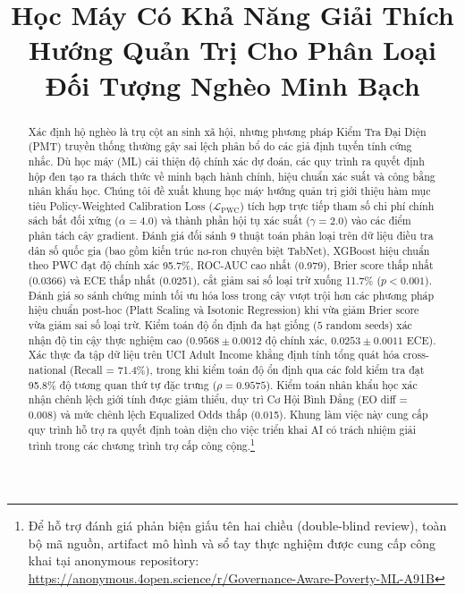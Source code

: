 \documentclass[conference]{IEEEtran}
\begin{document}
\title{Học Máy Có Khả Năng Giải Thích Hướng Quản Trị Cho Phân Loại Đối Tượng Nghèo Minh Bạch}

\author{
}

\maketitle

\begin{abstract}
Xác định hộ nghèo là trụ cột an sinh xã hội, nhưng phương pháp Kiểm Tra Đại Diện (PMT) truyền thống thường gây sai lệch phân bổ do các giả định tuyến tính cứng nhắc. Dù học máy (ML) cải thiện độ chính xác dự đoán, các quy trình ra quyết định hộp đen tạo ra thách thức về minh bạch hành chính, hiệu chuẩn xác suất và công bằng nhân khẩu học. Chúng tôi đề xuất khung học máy hướng quản trị giới thiệu hàm mục tiêu Policy-Weighted Calibration Loss ($\mathcal{L}_{\text{PWC}}$) tích hợp trực tiếp tham số chi phí chính sách bất đối xứng ($\alpha=4.0$) và thành phần hội tụ xác suất ($\gamma=2.0$) vào các điểm phân tách cây gradient. Đánh giá đối sánh 9 thuật toán phân loại trên dữ liệu điều tra dân số quốc gia (bao gồm kiến trúc nơ-ron chuyên biệt TabNet), XGBoost hiệu chuẩn theo PWC đạt độ chính xác 95.7\%, ROC-AUC cao nhất (0.979), Brier score thấp nhất (0.0366) và ECE thấp nhất (0.0251), cắt giảm sai số loại trừ xuống 11.7\% ($p < 0.001$). Đánh giá so sánh chứng minh tối ưu hóa loss trong cây vượt trội hơn các phương pháp hiệu chuẩn post-hoc (Platt Scaling và Isotonic Regression) khi vừa giảm Brier score vừa giảm sai số loại trừ. Kiểm toán độ ổn định đa hạt giống ($5$ random seeds) xác nhận độ tin cậy thực nghiệm cao ($0.9568 \pm 0.0012$ độ chính xác, $0.0253 \pm 0.0011$ ECE). Xác thực đa tập dữ liệu trên UCI Adult Income khẳng định tính tổng quát hóa cross-national (Recall = 71.4\%), trong khi kiểm toán độ ổn định qua các fold kiểm tra đạt 95.8\% độ tương quan thứ tự đặc trưng ($\rho=0.9575$). Kiểm toán nhân khẩu học xác nhận chênh lệch giới tính được giảm thiểu, duy trì Cơ Hội Bình Đẳng (EO diff = 0.008) và mức chênh lệch Equalized Odds thấp (0.015). Khung làm việc này cung cấp quy trình hỗ trợ ra quyết định toàn diện cho việc triển khai AI có trách nhiệm giải trình trong các chương trình trợ cấp công cộng.\footnote{Để hỗ trợ đánh giá phản biện giấu tên hai chiều (double-blind review), toàn bộ mã nguồn, artifact mô hình và sổ tay thực nghiệm được cung cấp công khai tại anonymous repository: \url{https://anonymous.4open.science/r/Governance-Aware-Poverty-ML-A91B}}
\end{abstract}
\end{document}
